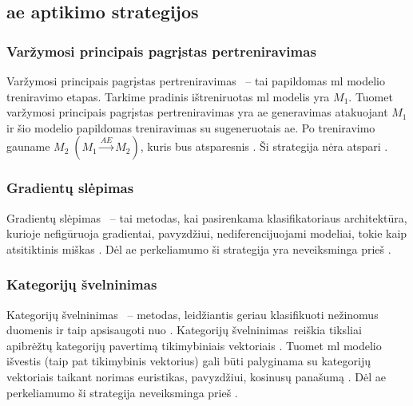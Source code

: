 \subsection{\gls{ae} aptikimo strategijos}\label{sec:literature:defense}

\def\strat{Varžymosi principais pagrįstas pertreniravimas}
\subsubsection{\strat}\label{sec:literature:defense:retraining}

\strat~ -- tai papildomas \gls{ml} modelio treniravimo etapas. Tarkime pradinis ištreniruotas \gls{ml} modelis yra $M_1$. Tuomet \lowercase{\strat} yra \gls{ae} generavimas atakuojant $M_1$ ir šio modelio papildomas treniravimas su sugeneruotais \gls{ae}. Po treniravimo gauname $M_2 \; (M_1 \xrightarrow{AE} M_2)$, kuris bus atsparesnis . Ši strategija nėra atspari  \cite{chakrabortySurveyAdversarialAttacks2021}.



\def\strat{Gradientų slėpimas}
\subsubsection{\strat}

\strat~ -- tai metodas, kai pasirenkama klasifikatoriaus architektūra, kurioje nefigūruoja gradientai, pavyzdžiui, nediferencijuojami modeliai, tokie kaip atsitiktinis miškas . Dėl \gls{ae} perkeliamumo  ši strategija yra neveiksminga prieš  \cite{chakrabortySurveyAdversarialAttacks2021}.



\def\strat{Kategorijų švelninimas}
\subsubsection{\strat}

\strat~ -- metodas, leidžiantis geriau klasifikuoti nežinomus duomenis ir taip apsisaugoti nuo . \strat~reiškia tiksliai apibrėžtų kategorijų  pavertimą tikimybiniais vektoriais . Tuomet \gls{ml} modelio išvestis (taip pat tikimybinis vektorius) gali būti palyginama su kategorijų vektoriais taikant norimas euristikas, pavyzdžiui, kosinusų panašumą . Dėl \gls{ae} perkeliamumo  ši strategija neveiksminga prieš  \cite{chakrabortySurveyAdversarialAttacks2021}.



